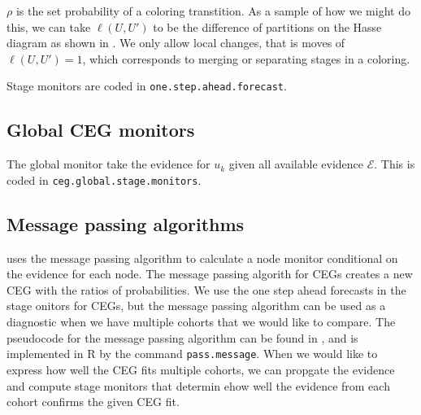 \documentclass[12pt]{article}
\begin{document}
$\rho$ is the set probability of a coloring transtition. As a sample of how we might do this, we can take $\ell (U, U')$ to be the difference of partitions on the Hasse diagram as shown in \cite{Freeman}. We only allow local changes, that is moves of $\ell(U,U')=1$, which corresponds to merging or separating stages in a coloring. 


% 
% 
 
 Stage monitors are coded in \texttt{one.step.ahead.forecast}. 
 
 
\subsection{Global CEG monitors}

The global monitor take the evidence for $u_k$ given all available evidence $\mathcal{E}$. This is coded in \texttt{ceg.global.stage.monitors}. 


\subsection{Message passing algorithms}

\cite{diagnostics} uses the message passing algorithm to calculate a node monitor conditional on the evidence for each node. The message passing algorith for CEGs  creates a new CEG with the ratios of probabilities. We use the one step ahead forecasts in the stage onitors for CEGs, but the message passing algorithm can be used as a diagnostic when we have multiple cohorts that we would like to compare. The pseudocode for the message passing algorithm can be found in \cite{Rodriguo}, and is implemented in R by the command \texttt{pass.message}. When we would like to express how well the CEG fits multiple cohorts, we can propgate the evidence and compute stage monitors that determin ehow well the evidence from each cohort confirms the given CEG fit. 
\end{document}
